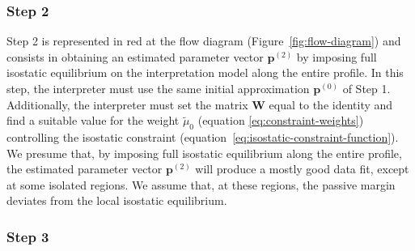\documentclass[manuscript]{geophysics}
\begin{document}
\subsubsection{Step 2}

Step 2 is represented in red at the flow diagram (Figure~\ref{fig:flow-diagram})
and consists in obtaining an estimated parameter vector $\mathbf{p}^{(2)}$
by imposing full isostatic equilibrium on the interpretation model along the entire profile.
In this step, the interpreter must use the same initial approximation $\mathbf{p}^{(0)}$
of Step 1.
Additionally, the interpreter must set the matrix $\mathbf{W}$
equal to the identity and find a suitable value for the weight $\tilde{\mu}_{0}$ 
(equation \ref{eq:constraint-weights}) controlling the isostatic constraint 
(equation~\ref{eq:isostatic-constraint-function}).
We presume that, by imposing full isostatic equilibrium along the entire profile,
the estimated parameter vector $\mathbf{p}^{(2)}$ will produce a mostly good data fit,
except at some isolated regions. 
We assume that, at these regions, the passive margin deviates 
from the local isostatic equilibrium.

\subsubsection{Step 3}
\end{document}
